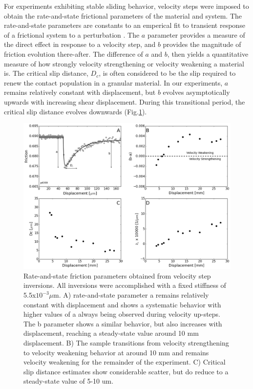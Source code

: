 \documentclass[11pt]{article}
\begin{document}
For experiments exhibiting stable sliding behavior, velocity steps were imposed
to obtain the rate-and-state frictional parameters of the material and system.
The rate-and-state parameters are constants to an emperical fit to transient
response of a frictional system to a perturbation \cite{Marone:1998}. The $a$
parameter provides a measure of the direct effect in response to a velocity
step, and $b$ provides the magnitude of friction evolution there-after. The
difference of $a$ and $b$, then yields a quantitative measure of how strongly
velocity strengthening or velocity weakening a material is. The critical slip
distance, $D_c$, is often considered to be the slip required to renew the
contact population in a granular material. In our experiments, $a$ remains
relatively constant with displacement, but $b$ evolves asymptotically upwards
with increasing shear displacement. During this transitional period, the
critical slip distance evolves downwards (Fig.\ref{Figure:RSF Props}).

\begin{figure}
    \centering
        \includegraphics[scale=0.45]{../Figures/Fig_RSF_Parameters/RSF_Parameters.png}
       \caption{Rate-and-state friction parameters obtained from velocity step
       inversions. All inversions were accomplished with a fixed stiffness of
       5.5x$10 ^ {-3} \mu$m. A) rate-and-state parameter a remains relatively
       constant with displacement and shows a systematic behavior with higher
       values of a always being observed during velocity up-steps. The b
       parameter shows a similar behavior, but also increases with displacement,
       reaching a steady-state value around 10 mm displacement. B) The sample
       transitions from velocity strengthening to velocity weakening  behavior
       at around 10 mm and remains velocity weakening for the remainder of  the
       experiment. C) Critical slip distance estimates show considerable
       scatter,  but do reduce to a steady-state value of 5-10 um.  }
      \label{Figure:RSF Props}
\end{figure}
\end{document}

